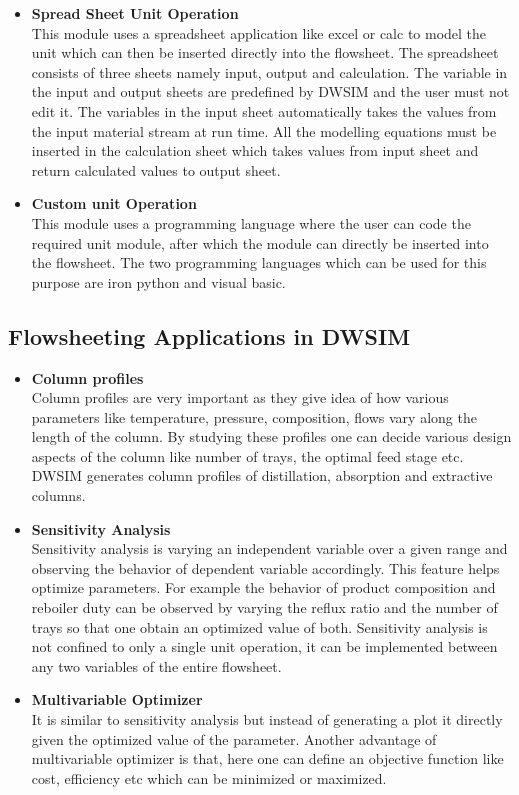 \documentclass[12pt]{report}
\begin{document}
\begin{itemize}
\item {\textbf{Spread Sheet Unit Operation}} \\
This module uses a spreadsheet application like excel or calc to model the unit which can then be inserted directly into the flowsheet. The spreadsheet consists of three sheets namely input, output and calculation. The variable in the input and output sheets are predefined by DWSIM and the user must not edit it. The variables in the input sheet automatically takes the values from the input material stream at run time. All the modelling equations must be inserted in the calculation sheet which takes values from input sheet and return calculated values to output sheet.
\item{\textbf{Custom unit Operation}} \\
This module uses a programming language where the user can code the required unit module, after which the module can directly be inserted into the flowsheet. The two programming languages which can be used for this purpose are iron python and visual basic.
\end{itemize}

\subsection{Flowsheeting Applications in DWSIM}
\begin{itemize}
\item {\textbf{Column profiles}} \\
Column profiles are very important as they give idea of how various parameters like temperature, pressure, composition, flows vary along the length of the column. By studying these profiles one can decide various design aspects of the column like number of trays, the optimal feed stage etc. DWSIM generates column profiles of distillation, absorption and extractive columns.

\item{\textbf{Sensitivity Analysis}} \\
Sensitivity analysis is varying an independent variable over a given range and observing the behavior of dependent variable accordingly. This feature helps optimize parameters. For example the behavior of product composition and reboiler duty can be observed by varying the reflux ratio and the number of trays so that one obtain an optimized value of both. Sensitivity analysis is not confined to only a single unit operation, it can be implemented between any two variables of the entire flowsheet.

\item{\textbf{Multivariable Optimizer}} \\
It is similar to sensitivity analysis but instead of generating a plot it directly given the optimized value of the parameter. Another advantage of multivariable optimizer is that, here one can define an objective function like cost, efficiency etc which can be minimized or maximized.

\end{itemize}
\end{document}

